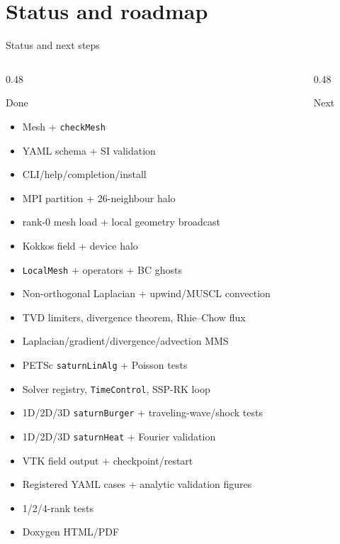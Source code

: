 \documentclass[aspectratio=169,10pt]{beamer}
\begin{document}
\section{Status and roadmap}

\begin{frame}{Status and next steps}
  \begin{columns}[T]
    \begin{column}{0.48\textwidth}
      \begin{block}{Done}
        \begin{itemize}
          \item Mesh + \texttt{checkMesh}
          \item YAML schema + SI validation
          \item CLI/help/completion/install
          \item MPI partition + 26-neighbour halo
          \item rank-0 mesh load + local geometry broadcast
          \item Kokkos field + device halo
          \item \texttt{LocalMesh} + operators + BC ghosts
          \item Non-orthogonal Laplacian + upwind/MUSCL convection
          \item TVD limiters, divergence theorem, Rhie--Chow flux
          \item Laplacian/gradient/divergence/advection MMS
          \item PETSc \texttt{saturnLinAlg} + Poisson tests
          \item Solver registry, \texttt{TimeControl}, SSP-RK loop
          \item 1D/2D/3D \texttt{saturnBurger} + traveling-wave/shock tests
          \item 1D/2D/3D \texttt{saturnHeat} + Fourier validation
          \item VTK field output + checkpoint/restart
          \item Registered YAML cases + analytic validation figures
          \item 1/2/4-rank tests
          \item Doxygen HTML/PDF
        \end{itemize}
      \end{block}
    \end{column}
    \begin{column}{0.48\textwidth}
      \begin{block}{Next}

\end{block}
\end{column}
\end{columns}
\end{frame}
\end{document}
